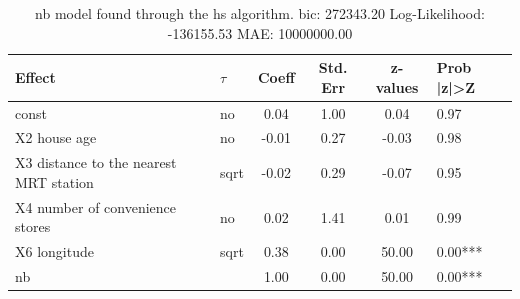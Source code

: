 \begin{table}
	\caption{nb model found through the hs algorithm. bic: 272343.20 Log-Likelihood: -136155.53 MAE: 10000000.00}
	\begin{center}
		\begin{tabular}{|l|l|c|c|c|l|}
			\hline
			Effect & $\tau$ & Coeff & Std. Err & z-values & Prob |z|>Z \\
			\hline
			const & no & 0.04 & 1.00 & 0.04 & 0.97 \\
			\hline
			X2 house age & no & -0.01 & 0.27 & -0.03 & 0.98 \\
			\hline
			X3 distance to the nearest MRT station & sqrt & -0.02 & 0.29 & -0.07 & 0.95 \\
			\hline
			X4 number of convenience stores & no & 0.02 & 1.41 & 0.01 & 0.99 \\
			\hline
			X6 longitude & sqrt & 0.38 & 0.00 & 50.00 & 0.00*** \\
			\hline
			nb &  & 1.00 & 0.00 & 50.00 & 0.00*** \\
			\hline
		\end{tabular}
	\end{center}
\end{table}